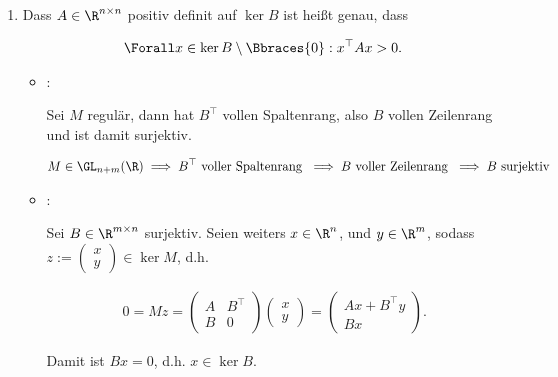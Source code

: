 \begin{solution}
\begin{enumerate}[label = \textbf{\alph*)}]
\begin{comment}
  \end{comment}

  \item Dass $A \in \R^{n \times n}$ positiv definit auf $\ker B$ ist heißt genau, dass

  \begin{align*}
    \Forall x \in \ker B \setminus \Bbraces{0}:
      x^\top A x > 0.
  \end{align*}

  \begin{itemize}

    \item \Quote{$\implies$}:

    Sei $M$ regulär, dann hat $B^\top$ vollen Spaltenrang, also $B$ vollen Zeilenrang und ist damit surjektiv.

    \begin{align*}
      M \in \GL_{n+m}(\R)
      \implies
      B^\top ~\text{voller Spaltenrang}~
      \implies
      B ~\text{voller Zeilenrang}~
      \implies
      B ~\text{surjektiv}
    \end{align*}

    \item \Quote{$\impliedby$}:

    Sei $B \in \R^{m \times n}$ surjektiv.
    Seien weiters $x \in \R^n$, und $y \in \R^m$, sodass $z := \begin{pmatrix} x \\ y \end{pmatrix} \in \ker M$, d.h.

    \begin{align*}
      0
      =
      M z
      =
      \begin{pmatrix}
        A & B^\top \\
        B & 0
      \end{pmatrix}
      \begin{pmatrix}
        x \\ y
      \end{pmatrix}
      =
      \begin{pmatrix}
        A x + B^\top y \\
        B x
      \end{pmatrix}.
    \end{align*}

    Damit ist $B x = 0$, d.h. $x \in \ker B$.


\end{itemize}
\end{enumerate}
\end{solution}
